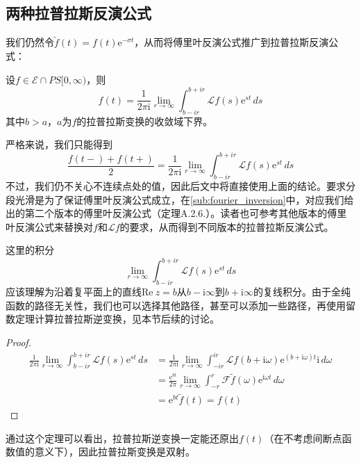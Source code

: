 \documentclass{ctexbook}
\begin{document}
\subsection{两种拉普拉斯反演公式}\label{sub:laplace_inversion}
我们仍然令$\tilde{f}(t)=f(t)\mathrm{e}^{-\sigma t}$，从而将傅里叶反演公式推广到拉普拉斯反演公式：
\begin{theorem}[拉普拉斯反演公式]
    设$f\in\mathcal{E}\cap PS[0,\infty) $，则
    \[f(t)=\frac{1}{2\pi \mathrm{i}}\lim_{r\to\infty}\int_{b-ir}^{b +ir}\mathcal{L} f(s)\mathrm{e}^{st}\,ds\]
    其中$b>a$，$a$为$f$的拉普拉斯变换的收敛域下界。
\end{theorem}
\begin{remark}
    严格来说，我们只能得到
    \[\frac{f(t-)+f(t+)}{2}=\frac{1}{2\pi \mathrm{i}}\lim_{r\to\infty}\int_{b-ir}^{b +ir}\mathcal{L} f(s)\mathrm{e}^{st}\,ds\]
    不过，我们仍不关心不连续点处的值，因此后文中将直接使用上面的结论。要求分段光滑是为了保证傅里叶反演公式成立，在\ref{sub:fourier_inversion}中，对应我们给出的第二个版本的傅里叶反演公式（定理A.2.6.）。读者也可参考其他版本的傅里叶反演公式来替换对$f$和$\mathcal{L} f$的要求，从而得到不同版本的拉普拉斯反演公式。
\end{remark}
\begin{remark}
    这里的积分\[\lim_{r\to\infty}\int_{b-ir}^{b +ir}\mathcal{L} f(s)\mathrm{e}^{st}\,ds\]
    应该理解为沿着复平面上的直线$\text{Re}\ z=b$从$b-\mathrm{i}\infty$到$b+\mathrm{i}\infty$的复线积分。由于全纯函数的路径无关性，我们也可以选择其他路径，甚至可以添加一些路径，再使用留数定理计算拉普拉斯逆变换，见本节后续的讨论。
\end{remark}
\begin{proof}
    \begin{align*}
        \frac{1}{2\pi \mathrm{i}}\lim_{r\to\infty}\int_{b-ir}^{b +ir}\mathcal{L} f(s)\mathrm{e}^{st}\,ds&=\frac{1}{2\pi \mathrm{i}}\lim_{r\to\infty}\int_{-ir}^{ir}\mathcal{L} f(b +\mathrm{i}\omega)\mathrm{e}^{(b +\mathrm{i}\omega)t}\mathrm{i}\,d\omega\\
        &=\frac{\mathrm{e}^{b t}}{2\pi}\lim_{r\to\infty}\int_{-r}^{r}\mathcal{F} \tilde{f}(\omega)\mathrm{e}^{\mathrm{i}\omega t}\,d\omega\\
        &=\mathrm{e}^{b t}\tilde{f}(t)=f(t)
    \end{align*}
\end{proof}

通过这个定理可以看出，拉普拉斯逆变换一定能还原出$f(t)$（在不考虑间断点函数值的意义下），因此拉普拉斯变换是双射。
\end{document}
